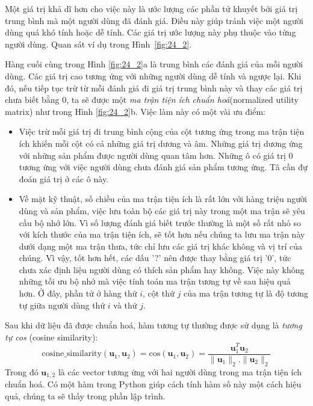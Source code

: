Một giá trị khả dĩ hơn cho việc này là ước lượng các phần tử khuyết bởi giá
trị trung bình mà một người dùng đã đánh giá. Điều này giúp tránh việc một
người dùng quá khó tính hoặc dễ tính. Các giá trị ước lượng này phụ thuộc
vào từng
người dùng. Quan sát ví dụ trong Hình~\ref{fig:24_2}.

Hàng cuối cùng trong Hình \ref{fig:24_2}a là trung bình các đánh giá của mỗi
người dùng. Các giá trị cao tương ứng với những người dùng dễ tính và ngược lại. Khi đó, nếu tiếp tục trừ từ mỗi đánh giá đi giá trị trung bình này và thay các giá trị chưa biết bằng 0,
ta sẽ được một \textit{ma trận tiện ích chuẩn hoá}({normalized utility
matrix}) như trong Hình \ref{fig:24_2}b. Việc làm này có một vài ưu điểm:

\begin{itemize}
\item Việc trừ mỗi giá trị đi trung bình cộng của {cột} tương ứng trong ma trận tiện ích khiến mỗi
cột có cả những giá trị dương và âm. Những giá trị dương ứng với những sản phẩm được người dùng quan tâm hơn. Những ô có giá trị 0 tương ứng với việc người dùng chưa đánh giá sản phẩm tương ứng. Tâ cần đự đoán giá trị ở các ô này.

\item Về mặt kỹ thuật, số chiều của ma trận tiện ích là rất lớn với
hàng triệu người dùng và sản phẩm, việc lưu toàn bộ các giá trị này
trong một ma trận sẽ yêu cầu bộ nhớ lớn.
Vì số lượng đánh giá biết trước thường là một số rất nhỏ so với kích thước
của ma trận tiện ích, sẽ tốt hơn nếu chúng ta lưu ma trận này dưới dạng một
ma trận thưa, tức chỉ lưu các giá trị khác không và vị trí của
chúng. Vì vậy, tốt hơn hết, các dấu '?' nên được thay bằng giá trị '0', tức
chưa xác định liệu người dùng có thích sản phẩm hay không. Việc này
không những tối ưu bộ nhớ mà việc tính toán ma trận tương tự về sau hiệu quả hơn. Ở đây, phần tử ở hàng thứ $i$, cột thứ $j$ của ma
trận tương tự là độ tương tự giữa người dùng thứ $i$
và thứ $j$.
\end{itemize}
Sau khi dữ liệu đã được chuẩn hoá, hàm tương tự thường được sử
dụng là \textit{tương tự cos} ({cosine similarity}):
\begin{equation}
\text{cosine\_similarity}(\mathbf{u}_1, \mathbf{u}_2) =\text{cos}(\mathbf{u}_1, \mathbf{u}_2)
=  \frac{\mathbf{u}_1^T\mathbf{u}_2}{ \|\mathbf{u}_1\|_2.\|\mathbf{u}_2\|_2}
\end{equation}
Trong đó $\mathbf{u}_{1, 2}$ là các vector tương ứng với hai người dùng trong ma
trận tiện ích chuẩn hoá. Có một hàm trong Python giúp cách tính hàm số này một
cách hiệu quả, chúng ta sẽ thấy trong phần lập trình.

